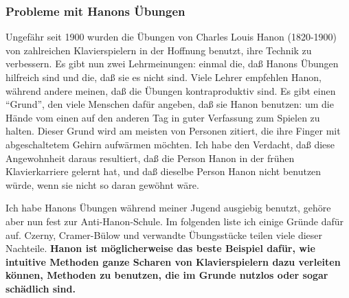 
\subsubsection{Probleme mit Hanons Übungen}
\label{c1iii7h}

Ungefähr seit 1900 wurden die Übungen von Charles Louis Hanon (1820-1900) von zahlreichen Klavierspielern in der Hoffnung benutzt, ihre Technik zu verbessern.
Es gibt nun zwei Lehrmeinungen: einmal die, daß Hanons Übungen hilfreich sind und die, daß sie es nicht sind.
Viele Lehrer empfehlen Hanon, während andere meinen, daß die Übungen kontraproduktiv sind.
Es gibt einen \enquote{Grund}, den viele Menschen dafür angeben, daß sie Hanon benutzen: um die Hände vom einen auf den anderen Tag in guter Verfassung zum Spielen zu halten.
Dieser Grund wird am meisten von Personen zitiert, die ihre Finger mit abgeschaltetem Gehirn aufwärmen möchten.
Ich habe den Verdacht, daß diese Angewohnheit daraus resultiert, daß die Person Hanon in der frühen Klavierkarriere gelernt hat, und daß dieselbe Person Hanon nicht benutzen würde, wenn sie nicht so daran gewöhnt wäre.

Ich habe Hanons Übungen während meiner Jugend ausgiebig benutzt, gehöre aber nun fest zur Anti-Hanon-Schule.
Im folgenden liste ich einige Gründe dafür auf.
Czerny, Cramer-Bülow und verwandte Übungsstücke teilen viele dieser Nachteile.
\textbf{Hanon ist möglicherweise das beste Beispiel dafür, wie intuitive Methoden ganze Scharen von Klavierspielern  dazu verleiten können, Methoden zu benutzen, die im Grunde nutzlos oder sogar schädlich sind.}


